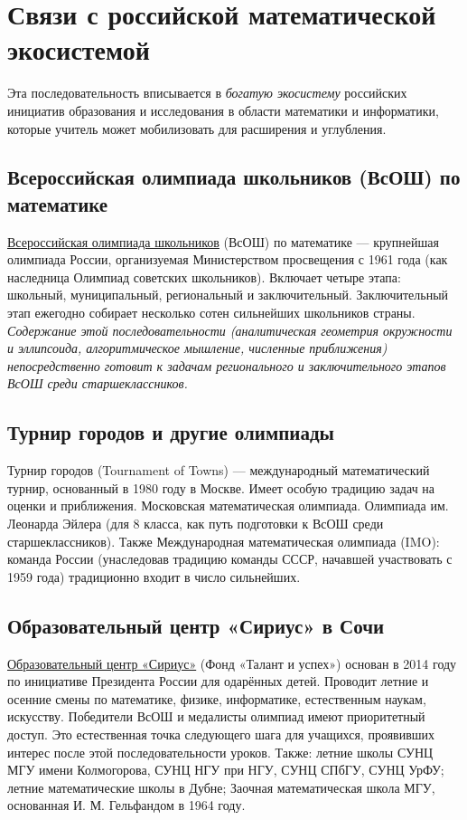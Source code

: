 \documentclass[12pt,a4paper]{scrartcl}
\begin{document}
\section{Связи с российской математической экосистемой}\label{sec:olimp}

Эта последовательность вписывается в \emph{богатую экосистему} российских инициатив образования и исследования в области математики и информатики, которые учитель может мобилизовать для расширения и углубления.

\subsection{Всероссийская олимпиада школьников (ВсОШ) по математике}

\href{https://olimpiada.ru/}{Всероссийская олимпиада школьников} (ВсОШ) по математике --- крупнейшая олимпиада России, организуемая Министерством просвещения с 1961 года (как наследница Олимпиад советских школьников). Включает четыре этапа: школьный, муниципальный, региональный и заключительный. Заключительный этап ежегодно собирает несколько сотен сильнейших школьников страны. \emph{Содержание этой последовательности (аналитическая геометрия окружности и эллипсоида, алгоритмическое мышление, численные приближения) непосредственно готовит к задачам регионального и заключительного этапов ВсОШ среди старшеклассников.}

\subsection{Турнир городов и другие олимпиады}

Турнир городов (Tournament of Towns) --- международный матема\-ти\-чес\-кий турнир, основанный в 1980 году в Москве. Имеет особую традицию задач на оценки и приближения. Московская математическая олимпиада. Олимпиада им. Леонарда Эйлера (для 8 класса, как путь подготовки к ВсОШ среди старшеклассников). Также Международная математическая олимпиада (IMO): команда России (унаследовав традицию команды СССР, начавшей участвовать с 1959 года) традиционно входит в число сильнейших.

\subsection{Образовательный центр «Сириус» в Сочи}

\href{https://sochisirius.ru/}{Образовательный центр «Сириус»} (Фонд «Талант и успех») основан в 2014 году по инициативе Президента России для одарённых детей. Проводит летние и осенние смены по математике, физике, информатике, естественным наукам, искусству. Победители ВсОШ и медалисты олимпиад имеют приоритетный доступ. Это естественная точка следующего шага для учащихся, проявивших интерес после этой последовательности уроков. Также: летние школы СУНЦ МГУ имени Колмогорова, СУНЦ НГУ при НГУ, СУНЦ СПбГУ, СУНЦ УрФУ; летние математические школы в Дубне; Заочная математическая школа МГУ, основанная И. М. Гельфандом в 1964 году.
\end{document}
